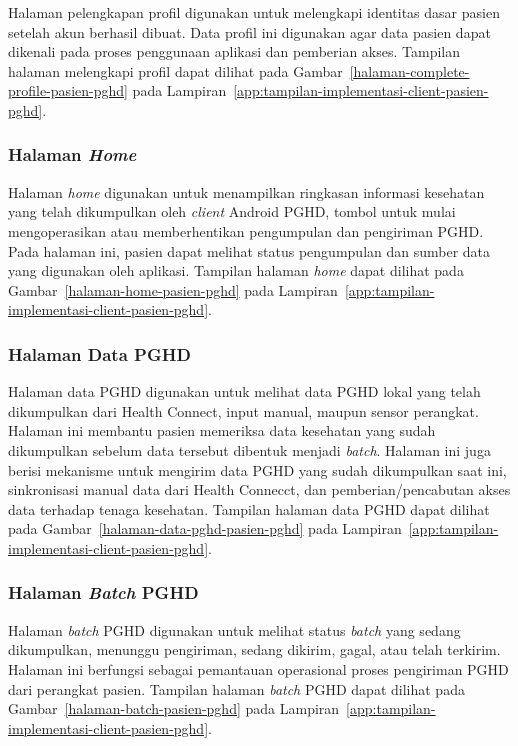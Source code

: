 Halaman pelengkapan profil digunakan untuk melengkapi identitas dasar pasien setelah akun berhasil dibuat. 
Data profil ini digunakan agar data pasien dapat dikenali pada proses penggunaan aplikasi dan pemberian akses.
Tampilan halaman melengkapi profil dapat dilihat pada Gambar~\ref{halaman-complete-profile-pasien-pghd} pada Lampiran~\ref{app:tampilan-implementasi-client-pasien-pghd}.

\subsubsection{Halaman \textit{Home}}

Halaman \textit{home} digunakan untuk menampilkan ringkasan informasi kesehatan yang telah dikumpulkan oleh \textit{client} Android PGHD, tombol untuk mulai mengoperasikan atau memberhentikan pengumpulan dan pengiriman PGHD\@. 
Pada halaman ini, pasien dapat melihat status pengumpulan dan sumber data yang digunakan oleh aplikasi.
Tampilan halaman \textit{home} dapat dilihat pada Gambar~\ref{halaman-home-pasien-pghd} pada Lampiran~\ref{app:tampilan-implementasi-client-pasien-pghd}.

\subsubsection{Halaman Data PGHD}

Halaman data PGHD digunakan untuk melihat data PGHD lokal yang telah dikumpulkan dari Health Connect, input manual, maupun sensor perangkat. 
Halaman ini membantu pasien memeriksa data kesehatan yang sudah dikumpulkan sebelum data tersebut dibentuk menjadi \textit{batch}.
Halaman ini juga berisi mekanisme untuk mengirim data PGHD yang sudah dikumpulkan saat ini, sinkronisasi manual data dari Health Connecct, dan pemberian/pencabutan akses data terhadap tenaga kesehatan.
Tampilan halaman data PGHD dapat dilihat pada Gambar~\ref{halaman-data-pghd-pasien-pghd} pada Lampiran~\ref{app:tampilan-implementasi-client-pasien-pghd}.

\subsubsection{Halaman \textit{Batch} PGHD}

Halaman \textit{batch} PGHD digunakan untuk melihat status \textit{batch} yang sedang dikumpulkan, menunggu pengiriman, sedang dikirim, gagal, atau telah terkirim. 
Halaman ini berfungsi sebagai pemantauan operasional proses pengiriman PGHD dari perangkat pasien.
Tampilan halaman \textit{batch} PGHD dapat dilihat pada Gambar~\ref{halaman-batch-pasien-pghd} pada Lampiran~\ref{app:tampilan-implementasi-client-pasien-pghd}.

